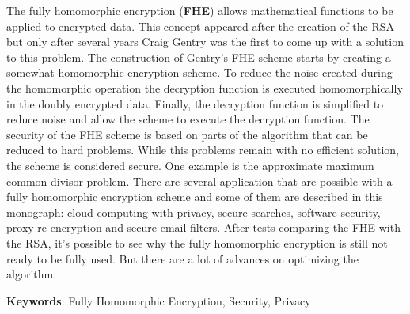 The fully homomorphic encryption (\textbf{FHE}) allows mathematical functions to be applied to encrypted data. This concept appeared after the creation of the RSA but only after several years Craig Gentry was the first to come up with a solution to this problem.
The construction of Gentry's FHE scheme starts by creating a somewhat homomorphic encryption scheme. To reduce the noise created during the homomorphic operation the decryption function is executed homomorphically in the doubly encrypted data. Finally, the decryption function is simplified to reduce noise and allow the scheme to execute the decryption function.
The security of the FHE scheme is based on parts of the algorithm that can be reduced to hard problems. While this problems remain with no efficient solution, the scheme is considered secure. One example is the approximate maximum common divisor problem.
There are several application that are possible with a fully homomorphic encryption scheme and some of them are described in this monograph: cloud computing with privacy, secure searches, software security, proxy re-encryption and secure email filters.
After tests comparing the FHE with the RSA, it's possible to see why the fully homomorphic encryption is still not ready to be fully used. But there are a lot of advances on optimizing the algorithm.

\noindent \textbf{Keywords}: Fully Homomorphic Encryption, Security, Privacy
